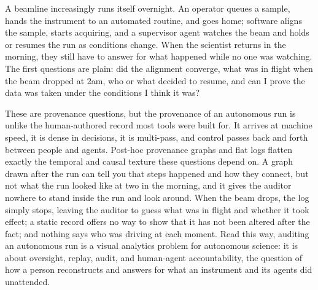 
A beamline increasingly runs itself overnight. An operator queues a sample,
hands the instrument to an automated routine, and goes home; software aligns the
sample, starts acquiring, and a supervisor agent watches the beam and holds or
resumes the run as conditions change. When the scientist returns in the morning,
they still have to answer for what happened while no one was watching. The first
questions are plain: did the alignment converge, what was in flight when the
beam dropped at 2am, who or what decided to resume, and can I prove the data was
taken under the conditions I think it was?

These are provenance questions, but the provenance of an autonomous run is
unlike the human-authored record most tools were built for. It arrives at
machine speed, it is dense in decisions, it is multi-pass, and control passes
back and forth between people and agents. Post-hoc provenance graphs and flat
logs flatten exactly the temporal and causal texture these questions depend on.
A graph drawn after the run can tell you that steps happened and how they connect,
but not what the run looked like at two in the morning, and it gives the auditor
nowhere to stand inside the run and look around. When the beam drops, the log
simply stops, leaving the auditor to guess what was
in flight and whether it took effect; a static record offers no way to show that
it has not been altered after the fact; and nothing says who was driving at each
moment. Read this way, auditing an autonomous run is a visual analytics problem
for autonomous science: it is about oversight, replay, audit, and human-agent
accountability, the question of how a person reconstructs and answers for what an
instrument and its agents did unattended.

